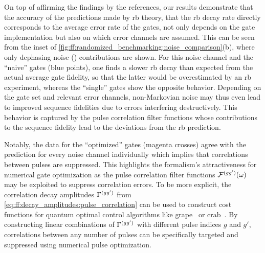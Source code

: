 On top of affirming the findings by the references, our results demonstrate that the accuracy of the predictions made by \gls{rb} theory, \ie that the \gls{rb} decay rate directly corresponds to the average error rate of the gates, not only depends on the gate implementation but also on which error channels are assumed.
This can be seen from the inset of \cref{fig:ff:randomized_benchmarking:noise_comparison}(b), where only dephasing noise (\sz) contributions are shown.
For this noise channel and the \enquote{naive} gates (blue points), one finds a slower \gls{rb} decay than expected from the actual average gate fidelity, so that the latter would be overestimated by an \gls{rb} experiment, whereas the \enquote{single} gates show the opposite behavior.
Depending on the gate set and relevant error channels, non-Markovian noise may thus even lead to improved sequence fidelities due to errors interfering destructively.
This behavior is captured by the pulse correlation filter functions whose contributions to the sequence fidelity lead to the deviations from the \gls{rb} prediction.

Notably, the data for the \enquote{optimized} gates (magenta crosses) agree with the prediction for every noise channel individually which implies that correlations between pulses are suppressed.
This highlights the formalism's attractiveness for numerical gate optimization as the pulse correlation filter functions $\mathcal{F}^{(gg^\prime)}(\omega)$ may be exploited to suppress correlation errors.
To be more explicit, the correlation decay amplitudes $\Gamma^{(gg^\prime)}$ from \cref{eq:ff:decay_amplitudes:pulse_correlation} can be used to construct cost functions for quantum optimal control algorithms like \acrshort{grape}~\cite{Khaneja2005,Schulte-Herbruggen2005} or \acrshort{crab}~\cite{Caneva2011}.
By constructing linear combinations of $\Gamma^{(gg')}$ with different pulse indices $g$ and $g'$, correlations between any number of pulses can be specifically targeted and suppressed using numerical pulse optimization.

